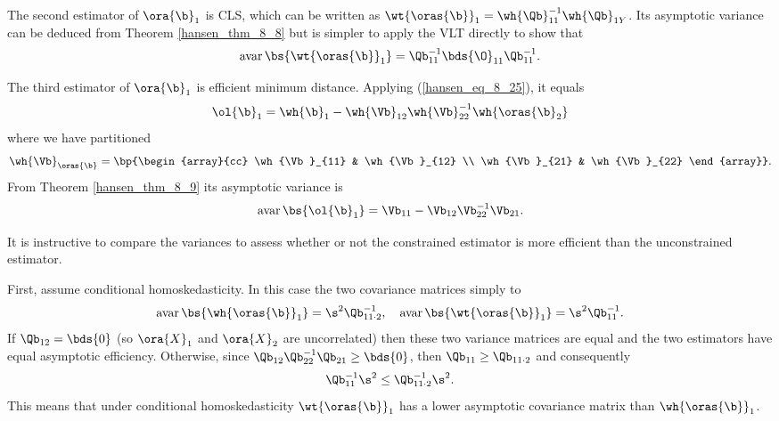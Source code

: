 The second estimator of $\ora{\b}_1$ is CLS, which can be written as $\wt{\oras{\b}}_1 = \wh{\Qb}_{11}^{-1} \wh{\Qb}_{1Y}$. Its asymptotic variance can be deduced from Theorem \ref{hansen_thm_8_8} but is simpler to apply the VLT directly to show that 
\begin{equation}
    \label{hansen_eq_8_29}
    \operatorname{avar}\bs{\wt{\oras{\b}}_1} = \Qb_{11}^{-1} \bds{\O}_{11} \Qb_{11}^{-1}.
\end{equation}

The third estimator of $\ora{\b}_1$ is efficient minimum distance. Applying (\ref{hansen_eq_8_25}), it equals 
\begin{equation}
    \label{hansen_eq_8_30}
    \ol{\b}_1 = \wh{\b}_1 - \wh{\Vb}_{12} \wh{\Vb}_{22}^{-1} \wh{\oras{\b}_2}
\end{equation}
where we have partitioned 
\begin{equation}
    \notag 
    \wh{\Vb}_{\oras{\b}} = \bp{\begin{array}{cc}
        \wh{\Vb}_{11} & \wh{\Vb}_{12} \\
        \wh{\Vb}_{21} & \wh{\Vb}_{22}
    \end{array}}.
\end{equation}
From Theorem \ref{hansen_thm_8_9} its asymptotic variance is 
\begin{equation}
    \label{hansen_eq_8_31}
    \operatorname{avar}\bs{\ol{\b}_1} = \Vb_{11} - \Vb_{12} \Vb_{22}^{-1} \Vb_{21}.
\end{equation}

 It is instructive to compare the variances to assess whether or not the constrained estimator is more efficient than the unconstrained estimator.

First, assume conditional homoskedasticity. In this case the two covariance matrices simply to 
\begin{equation}
    \notag 
    \operatorname{avar}\bs{\wh{\oras{\b}}_1} = \s^2 \Qb_{11 \cdot 2}^{-1}, \quad \operatorname{avar}\bs{\wt{\oras{\b}}_1} = \s^2 \Qb_{11}^{-1}.
\end{equation}
If $\Qb_{12} = \bds{0}$ (so $\ora{X}_1$ and $\ora{X}_2$ are uncorrelated) then these two variance matrices are equal and the two estimators have equal asymptotic efficiency. Otherwise, since $\Qb_{12} \Qb_{22}^{-1} \Qb_{21} \geq \bds{0}$, then $\Qb_{11} \geq \Qb_{11 \cdot 2}$ and consequently 
\begin{equation}
    \notag 
    \Qb_{11}^{-1} \s^2 \leq \Qb_{11 \cdot 2}^{-1} \s^2.
\end{equation}
This means that under conditional homoskedasticity $\wt{\oras{\b}}_1$ has a lower asymptotic covariance matrix than $\wh{\oras{\b}}_1$. 

